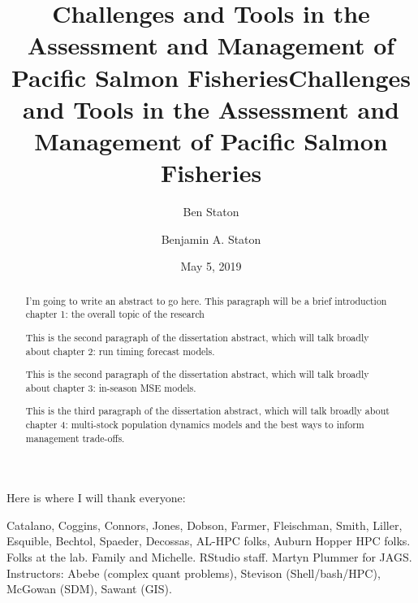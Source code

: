 \documentclass[12pt,]{book}
\title{Challenges and Tools in the Assessment and Management of Pacific Salmon
Fisheries}
\author{Ben Staton}
\date{}
\title{Challenges and Tools in the Assessment and Management of Pacific Salmon Fisheries}
\author{Benjamin A. Staton}
\date{May 5, 2019} %
\theoremstyle{definition}
\theoremstyle{definition}
\theoremstyle{definition}
\theoremstyle{remark}
\begin{document}
\maketitle

\begin{romanpages}      %

\TitlePage 

\doublespacing
\setlength{\parskip}{0pt plus 0pt minus 0pt}

\begin{abstract} 
\noindent
I'm going to write an abstract to go here. This paragraph will be a brief introduction chapter 1: the overall topic of the research

This is the second paragraph of the dissertation abstract, which will talk broadly about chapter 2: run timing forecast models.

This is the second paragraph of the dissertation abstract, which will talk broadly about chapter 3: in-season MSE models.

This is the third paragraph of the dissertation abstract, which will talk broadly about chapter 4: multi-stock population dynamics models and the best ways to inform management trade-offs. 

\end{abstract}

\begin{acknowledgments}
\noindent
Here is where I will thank everyone:

Catalano, Coggins, Connors, Jones, Dobson, Farmer, Fleischman, Smith, Liller, Esquible, Bechtol, Spaeder, Decossas, AL-HPC folks, Auburn Hopper HPC folks. Folks at the lab. Family and Michelle. RStudio staff. Martyn Plummer for JAGS. Instructors: Abebe (complex quant problems), Stevison (Shell/bash/HPC), McGowan (SDM), Sawant (GIS).  

\end{acknowledgments}

\begin{singlespace}
	\tableofcontents
	\clearpage
	\listoffigures
	\clearpage
	\listoftables
\end{singlespace}

\end{romanpages}        %

\normalem       %

\end{document}
